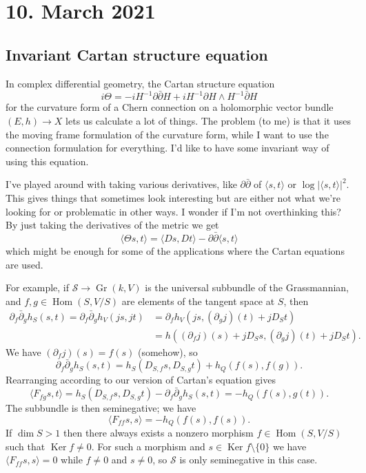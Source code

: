 \documentclass[11pt]{article}
\theoremstyle{definition}
\newcommand{\cc}[1]{\mathcal{#1}}
\DeclareMathOperator{\Gr}{Gr}
\DeclareMathOperator{\Ker}{Ker}
\DeclareMathOperator{\Hom}{Hom}
\begin{document}
\section*{10. March 2021}

\subsection*{Invariant Cartan structure equation}

In complex differential geometry, the Cartan structure equation
$$
i\Theta
= -iH^{-1} \partial \bar\partial H
+ i H^{-1} \partial H \wedge H^{-1} \bar\partial H
$$
for the curvature form of a Chern connection on a holomorphic vector bundle $(E, h) \to X$ lets us calculate a lot of things. The problem (to me) is that it uses the moving frame formulation of the curvature form, while I want to use the connection formulation for everything. I'd like to have some invariant way of using this equation.

I've played around with taking various derivatives, like $\partial\bar\partial$ of $\langle s, t \rangle$ or $\log |\langle s, t\rangle|^2$. This gives things that sometimes look interesting but are either not what we're looking for or problematic in other ways. I wonder if I'm not overthinking this? By just taking the derivatives of the metric we get
$$
\langle \Theta s, t \rangle
= \langle D s, D t \rangle
- \partial\bar\partial \langle s, t \rangle
$$
which might be enough for some of the applications where the Cartan equations are used.

For example, if $\cc S \to \Gr(k, V)$ is the universal subbundle of the Grassmannian, and $f,g \in \Hom(S,V/S)$ are elements of the tangent space at $S$, then
\begin{align*}
\partial_f\bar\partial_g h_S(s,t)
= \partial_f \bar\partial_g h_V(js,jt)
&= \partial_f h_V(js, (\partial_g j)(t) + jD_St)
\\
&= h((\partial_f j)(s) + jD_S s,(\partial_g j)(t) + jD_St).
\end{align*}
We have $(\partial_fj)(s) = f(s)$ (somehow), so
$$
\partial_f\bar\partial_g h_S(s,t)
= h_S(D_{S,f} s, D_{S,g} t) + h_Q(f(s),f(g)).
$$
Rearranging according to our version of Cartan's equation gives
$$
\langle F_{fg}s,t \rangle
= h_S(D_{S,f} s, D_{S,g} t) - \partial_f\bar\partial_g h_S(s,t)
= -h_Q(f(s),g(t)).
$$
The subbundle is then seminegative; we have
$$
\langle F_{ff}s,s \rangle
= -h_Q(f(s),f(s)).
$$
If $\dim S > 1$ then there always exists a nonzero morphism $f \in \Hom(S, V/S)$ such that $\Ker f \not= 0$. For such a morphism and $s \in \Ker f \setminus \{0\}$ we have $\langle F_{ff}s, s \rangle = 0$ while $f \not=0$ and $s \not= 0$, so $\cc S$ is only seminegative in this case.
\end{document}
